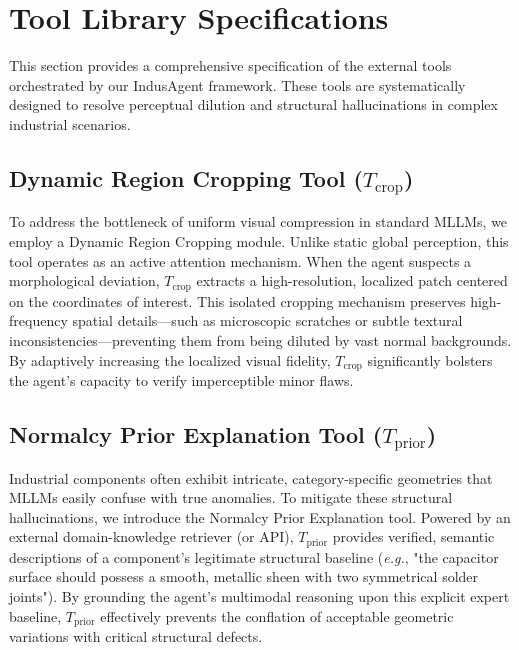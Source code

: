\documentclass{article}
\begin{document}
{\section{Tool Library Specifications}
\label{appx:tool_library}
This section provides a comprehensive specification of the external tools orchestrated by our IndusAgent framework. These tools are systematically designed to resolve perceptual dilution and structural hallucinations in complex industrial scenarios.

\subsection{Dynamic Region Cropping Tool ($T_{\text{crop}}$)}
To address the bottleneck of uniform visual compression in standard MLLMs, we employ a Dynamic Region Cropping module. Unlike static global perception, this tool operates as an active attention mechanism. When the agent suspects a morphological deviation, $T_{\text{crop}}$ extracts a high-resolution, localized patch centered on the coordinates of interest. This isolated cropping mechanism preserves high-frequency spatial details—such as microscopic scratches or subtle textural inconsistencies—preventing them from being diluted by vast normal backgrounds. By adaptively increasing the localized visual fidelity, $T_{\text{crop}}$ significantly bolsters the agent's capacity to verify imperceptible minor flaws.

\subsection{Normalcy Prior Explanation Tool ($T_{\text{prior}}$)}
Industrial components often exhibit intricate, category-specific geometries that MLLMs easily confuse with true anomalies. To mitigate these structural hallucinations, we introduce the Normalcy Prior Explanation tool. Powered by an external domain-knowledge retriever (or API), $T_{\text{prior}}$ provides verified, semantic descriptions of a component's legitimate structural baseline (\textit{e.g.}, "the capacitor surface should possess a smooth, metallic sheen with two symmetrical solder joints"). By grounding the agent's multimodal reasoning upon this explicit expert baseline, $T_{\text{prior}}$ effectively prevents the conflation of acceptable geometric variations with critical structural defects.

}
\end{document}
